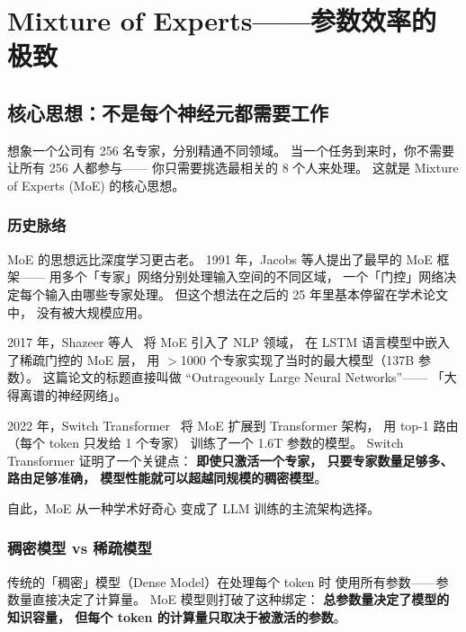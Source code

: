 \chapter{Mixture of Experts——参数效率的极致}
\label{ch:moe}

\section{核心思想：不是每个神经元都需要工作}

想象一个公司有 256 名专家，分别精通不同领域。
当一个任务到来时，你不需要让所有 256 人都参与——
你只需要挑选最相关的 8 个人来处理。
这就是 Mixture of Experts (MoE) 的核心思想。

\subsection{历史脉络}

MoE 的思想远比深度学习更古老。
1991 年，Jacobs 等人提出了最早的 MoE 框架——%
用多个「专家」网络分别处理输入空间的不同区域，
一个「门控」网络决定每个输入由哪些专家处理。
但这个想法在之后的 25 年里基本停留在学术论文中，
没有被大规模应用。

2017 年，Shazeer 等人~\cite{shazeer2017moe}
将 MoE 引入了 NLP 领域，
在 LSTM 语言模型中嵌入了稀疏门控的 MoE 层，
用 $>$1000 个专家实现了当时的最大模型（137B 参数）。
这篇论文的标题直接叫做
``Outrageously Large Neural Networks''——
「大得离谱的神经网络」。

2022 年，Switch Transformer~\cite{fedus2022switch}
将 MoE 扩展到 Transformer 架构，
用 top-1 路由（每个 token 只发给 1 个专家）
训练了一个 1.6T 参数的模型。
Switch Transformer 证明了一个关键点：
\textbf{即使只激活一个专家，
只要专家数量足够多、路由足够准确，
模型性能就可以超越同规模的稠密模型}。

自此，MoE 从一种学术好奇心
变成了 LLM 训练的主流架构选择。

\subsection{稠密模型 vs 稀疏模型}

传统的「稠密」模型（Dense Model）在处理每个 token 时
使用所有参数——参数量直接决定了计算量。
MoE 模型则打破了这种绑定：
\textbf{总参数量决定了模型的知识容量，
但每个 token 的计算量只取决于被激活的参数}。

